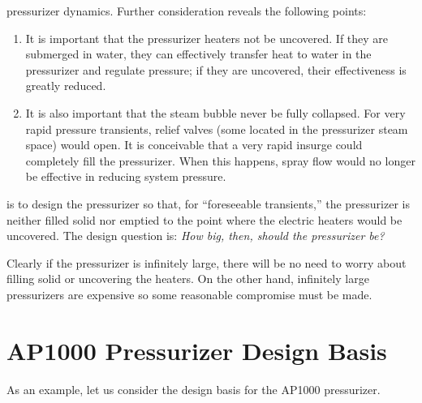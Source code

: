  pressurizer dynamics.  Further consideration reveals the following points:

\begin{enumerate}
\item It is important that the pressurizer heaters not be uncovered.  If they are submerged in water, they can effectively transfer heat to water in the pressurizer and regulate pressure; if they are uncovered, their effectiveness is greatly reduced.

\item It is also important that the steam bubble never be fully collapsed.  For very rapid pressure transients, relief valves (some located in the pressurizer steam space) would open.  It is conceivable that a very rapid insurge could completely fill the pressurizer.  When this happens, spray flow would no longer be effective in reducing system pressure.
\end{enumerate}

 is to design the pressurizer so that, for ``foreseeable transients,'' the pressurizer is neither filled solid nor emptied to the point where the electric heaters would be uncovered.
The design question is: \emph{How big, then, should the pressurizer be?}

Clearly if the pressurizer is infinitely large, there will be no need to worry about filling solid or uncovering the heaters.  On the other hand, infinitely large pressurizers are expensive so some reasonable compromise must be made.

\section{AP1000 Pressurizer Design Basis}
As an example, let us consider the design basis for the AP1000 pressurizer.

